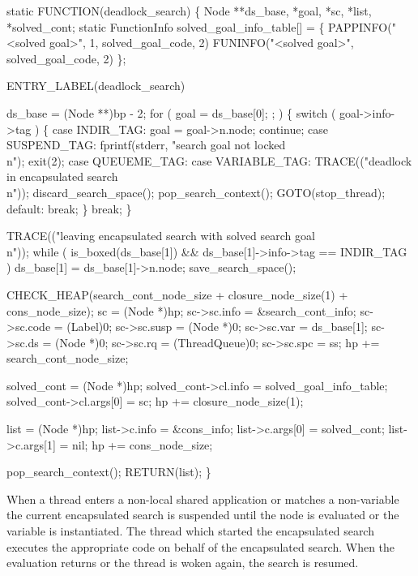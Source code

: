 \nwenddocs{}\plusendmoddef\nwstartdeflinemarkup{}\nwenddeflinemarkup
static
FUNCTION(deadlock_search)
\{
    Node **ds_base, *goal, *sc, *list, *solved_cont;
    static FunctionInfo solved_goal_info_table[] = \{
        PAPPINFO("<solved goal>", 1, solved_goal_code, 2)
        FUNINFO("<solved goal>",     solved_goal_code, 2)
    \};

 ENTRY_LABEL(deadlock_search)

    ds_base = (Node **)bp - 2;
    for ( goal = ds_base[0]; ; )
    \{
        switch ( goal->info->tag )
        \{
        case INDIR_TAG:
            goal = goal->n.node;
            continue;
        case SUSPEND_TAG:
            fprintf(stderr, "search goal not locked\\n");
            exit(2);
        case QUEUEME_TAG:
        case VARIABLE_TAG:
            TRACE(("deadlock in encapsulated search\\n"));
            discard_search_space();
            pop_search_context();
            GOTO(stop_thread);
        default:
            break;
        \}
        break;
    \}

    TRACE(("leaving encapsulated search with solved search goal\\n"));
    while ( is_boxed(ds_base[1]) && ds_base[1]->info->tag == INDIR_TAG )
        ds_base[1] = ds_base[1]->n.node;
    save_search_space();

    CHECK_HEAP(search_cont_node_size + closure_node_size(1) + cons_node_size);
    sc          = (Node *)hp;
    sc->sc.info = &search_cont_info;
    sc->sc.code = (Label)0;
    sc->sc.susp = (Node *)0;
    sc->sc.var  = ds_base[1];
    sc->sc.ds   = (Node *)0;
    sc->sc.rq   = (ThreadQueue)0;
    sc->sc.spc  = ss;
    hp         += search_cont_node_size;

    solved_cont             = (Node *)hp;
    solved_cont->cl.info    = solved_goal_info_table;
    solved_cont->cl.args[0] = sc;
    hp                     += closure_node_size(1);

    list            = (Node *)hp;
    list->c.info    = &cons_info;
    list->c.args[0] = solved_cont;
    list->c.args[1] = nil;
    hp             += cons_node_size;

    pop_search_context();
    RETURN(list);
\}

\nwendcode{}\nwdocspar
When a thread enters a non-local shared application or matches a
non-variable the current encapsulated search is suspended until the
node is evaluated or the variable is instantiated. The thread which
started the encapsulated search executes the appropriate code on
behalf of the encapsulated search. When the evaluation returns or the
thread is woken again, the search is resumed.

